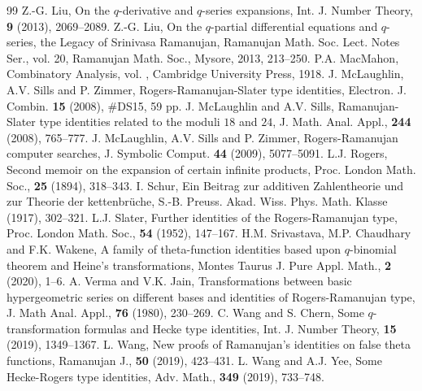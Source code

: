 \documentclass[reqno,12pt]{amsart}
\theoremstyle{remark}
\numberwithin{equation}{section}
\begin{document}
\begin{thebibliography}{99}
Z.-G. Liu, On the $q$-derivative and $q$-series expansions, Int. J. Number Theory, \textbf{9} (2013), 2069--2089.
    Z.-G. Liu, On the $q$-partial differential equations and $q$-series, the Legacy of Srinivasa Ramanujan, Ramanujan Math. Soc. Lect. Notes Ser., vol. 20, Ramanujan Math. Soc., Mysore, 2013, 213--250.
        P.A. MacMahon, Combinatory Analysis, vol. \MakeUppercase{}, Cambridge University Press, 1918.
             J. McLaughlin, A.V. Sills and P. Zimmer, Rogers-Ramanujan-Slater type identities, Electron. J. Combin. \textbf{15} (2008),  \#DS15, 59 pp.
        J. McLaughlin and A.V. Sills, Ramanujan-Slater type identities related to the moduli $18$ and $24$, J. Math. Anal. Appl., \textbf{244} (2008), 765--777.
        J. McLaughlin, A.V. Sills and P. Zimmer, Rogers-Ramanujan computer searches, J. Symbolic Comput. \textbf{44} (2009), 5077--5091.
 L.J. Rogers, Second memoir on the expansion of certain infinite products, Proc. London Math. Soc., \textbf{25} (1894), 318--343.
     I. Schur, Ein Beitrag zur additiven Zahlentheorie und zur Theorie der kettenbr\"{u}che, S.-B. Preuss. Akad. Wiss. Phys. Math. Klasse (1917), 302--321.
L.J. Slater, Further identities of the Rogers-Ramanujan type, Proc. London Math. Soc., \textbf{54} (1952), 147--167.
    H.M. Srivastava, M.P. Chaudhary and F.K. Wakene, A family of theta-function identities based upon $q$-binomial theorem and Heine's transformations, Montes Taurus J. Pure Appl. Math., \textbf{2} (2020), 1--6.
    A. Verma and V.K. Jain, Transformations between basic hypergeometric series on different bases and identities of Rogers-Ramanujan type, J. Math Anal. Appl., \textbf{76} (1980), 230--269.
        C. Wang and S. Chern, Some $q$-transformation formulas and Hecke type identities, Int. J. Number Theory, \textbf{15} (2019), 1349--1367.
        L. Wang, New proofs of Ramanujan's identities on false theta functions, Ramanujan J., \textbf{50} (2019), 423--431.
         L. Wang and A.J. Yee, Some Hecke-Rogers type identities, Adv. Math., \textbf{349} (2019), 733--748.
\end{thebibliography}
\end{document}
